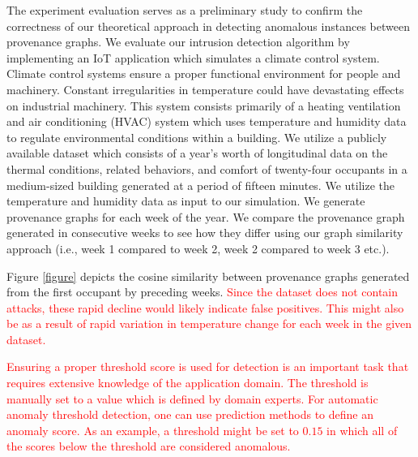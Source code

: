 The experiment evaluation serves as a preliminary study to confirm the correctness of our theoretical approach in detecting anomalous instances between provenance graphs. We evaluate our intrusion detection algorithm by implementing an IoT application which simulates a climate control system. Climate control systems ensure a proper functional environment for people and machinery. Constant irregularities in temperature could have devastating effects on industrial machinery. This system consists primarily of a heating ventilation and air conditioning (HVAC) system which uses temperature and humidity data to regulate environmental conditions within a building. We utilize a publicly available dataset \cite{LANGEVIN201594} which consists of a year's worth of longitudinal data on the thermal conditions, related behaviors, and comfort of twenty-four occupants in a medium-sized building generated at  a period of fifteen minutes. We utilize the temperature and humidity data as input to our simulation. We generate provenance graphs for each week of the year. We compare the provenance graph generated in consecutive weeks to see how they differ using our graph similarity approach (i.e., week 1 compared to week 2, week 2 compared to week 3 etc.). 
\par Figure \ref{figure} depicts the cosine similarity between provenance graphs generated from the first occupant by preceding weeks.  \textcolor{red}{ Since the dataset does not contain attacks, these rapid decline would likely indicate false positives. This might also be as a result of rapid variation in temperature change for each week in the given dataset.}


\textcolor{red}{ Ensuring a proper threshold score is used for detection is an important task that requires extensive knowledge of the application domain. The threshold is manually set to a value which is defined by domain experts. For automatic anomaly threshold detection, one can use prediction methods to define an anomaly score. As an example, a threshold might be set to $0.15$ in which all of the scores below the threshold are considered anomalous.}


